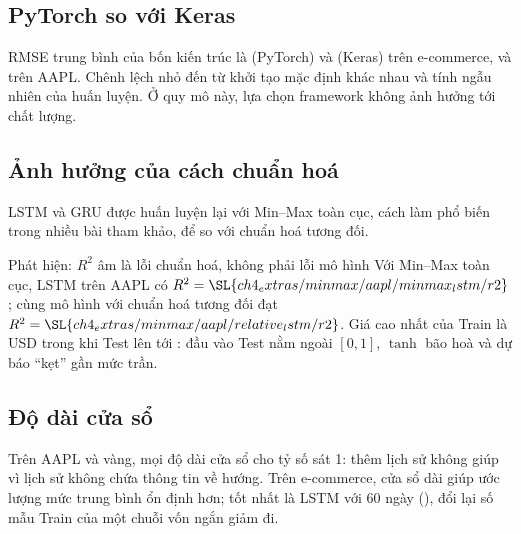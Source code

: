 \subsection{PyTorch so với Keras}

RMSE trung bình của bốn kiến trúc là  (PyTorch) và  (Keras) trên e-commerce,  và  trên AAPL. Chênh lệch nhỏ đến từ khởi tạo mặc định khác nhau và tính ngẫu nhiên của huấn luyện. Ở quy mô này,
lựa chọn framework không ảnh hưởng tới chất lượng.

\subsection{Ảnh hưởng của cách chuẩn hoá}
LSTM và GRU được huấn luyện lại với Min--Max toàn cục, cách làm phổ biến trong nhiều bài tham khảo, để so với chuẩn hoá tương đối.


\begin{phathien}{Phát hiện: $R^2$ âm là lỗi chuẩn hoá, không phải lỗi mô hình}
Với Min--Max toàn cục, LSTM trên AAPL có $R^2=\SL{ch4_extras/minmax/aapl/minmax_lstm/r2}$; cùng mô hình với chuẩn hoá tương đối đạt $R^2=\SL{ch4_extras/minmax/aapl/relative_lstm/r2}$. Giá cao nhất của Train là  USD trong khi Test lên tới : đầu vào Test nằm ngoài $[0,1]$, $\tanh$ bão hoà và dự báo ``kẹt'' gần mức trần.
\end{phathien}

\subsection{Độ dài cửa sổ}

Trên AAPL và vàng, mọi độ dài cửa sổ cho tỷ số sát 1: thêm lịch sử không giúp vì lịch sử không chứa thông tin về hướng. Trên e-commerce, cửa sổ dài giúp ước lượng mức trung bình ổn định hơn; tốt nhất là LSTM với 60 ngày (), đổi lại số mẫu Train của một chuỗi vốn ngắn giảm đi.

